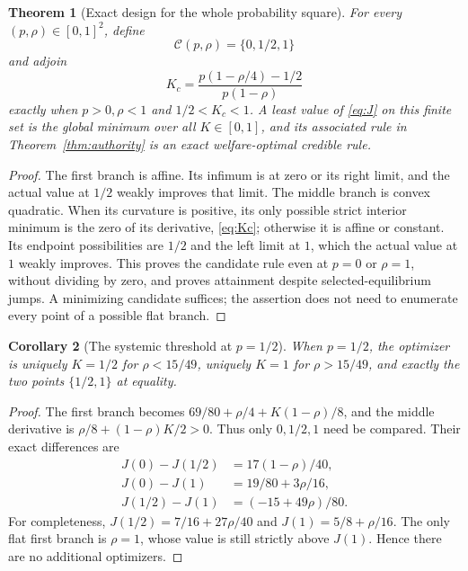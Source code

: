 \documentclass[11pt,a4paper]{article}
\numberwithin{equation}{section}
\newtheorem{theorem}{Theorem}[section]
\newtheorem{corollary}[theorem]{Corollary}
\theoremstyle{definition}
\begin{document}
\begin{theorem}[Exact design for the whole probability square]\label{thm:capital}
For every \((p,\rho)\in[0,1]^2\), define
\[
\mathcal C(p,\rho)=\{0,1/2,1\}
\]
and adjoin
\begin{equation}\label{eq:Kc}
 K_c=\frac{p(1-\rho/4)-1/2}{p(1-\rho)}
\end{equation}
exactly when \(p>0,\rho<1\) and \(1/2<K_c<1\). A least value of
\eqref{eq:J} on this finite set is the global minimum over all
\(K\in[0,1]\), and its associated rule in
Theorem~\ref{thm:authority} is an exact welfare-optimal credible rule.
\end{theorem}
\begin{proof}
The first branch is affine. Its infimum is at zero or its right limit,
and the actual value at \(1/2\) weakly improves that limit. The middle
branch is convex quadratic. When its curvature is positive, its only
possible strict interior minimum is the zero of its derivative,
\eqref{eq:Kc}; otherwise it is affine or constant. Its endpoint
possibilities are \(1/2\) and the left limit at \(1\), which the actual
value at \(1\) weakly improves. This proves the candidate rule even at
\(p=0\) or \(\rho=1\), without dividing by zero, and proves attainment
despite selected-equilibrium jumps. A minimizing candidate suffices;
the assertion does not need to enumerate every point of a possible
flat branch.
\end{proof}

\begin{corollary}[The systemic threshold at \(p=1/2\)]\label{cor:threshold}
When \(p=1/2\), the optimizer is uniquely \(K=1/2\) for \(\rho<15/49\),
uniquely \(K=1\) for \(\rho>15/49\), and exactly the two points
\(\{1/2,1\}\) at equality.
\end{corollary}
\begin{proof}
The first branch becomes \(69/80+\rho/4+K(1-\rho)/8\), and the
middle derivative is \(\rho/8+(1-\rho)K/2>0\).
Thus only \(0,1/2,1\) need be compared. Their exact differences are
\[
\begin{aligned}
J(0)-J(1/2)&=17(1-\rho)/40,\\
J(0)-J(1)&=19/80+3\rho/16,\\
J(1/2)-J(1)&=(-15+49\rho)/80.
\end{aligned}
\]
For completeness,
\(J(1/2)=7/16+27\rho/40\) and \(J(1)=5/8+\rho/16\).
The only flat first branch is \(\rho=1\), whose value is still strictly
above \(J(1)\). Hence there are no additional optimizers.
\end{proof}
\end{document}
